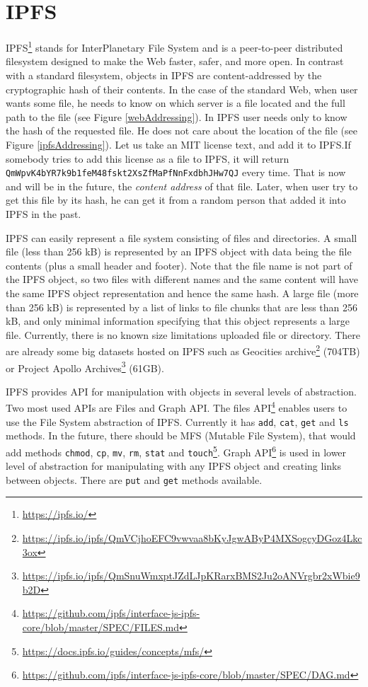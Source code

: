 \chapter{IPFS}
\label{ipfs}

IPFS\footnote{\url{https://ipfs.io/}} stands for InterPlanetary File System and is a peer-to-peer distributed filesystem designed to make the Web faster, safer, and more open. In contrast with a standard filesystem, objects in IPFS are content-addressed by the cryptographic hash of their contents. In the case of the standard Web, when user wants some file, he needs to know on which server is a file located and the full path to the file (see Figure \ref{webAddressing}). In IPFS user needs only to know the hash of the requested file. He does not care about the location of the file (see Figure \ref{ipfsAddressing}). Let us take an MIT license text, and add it to IPFS.If somebody tries to add this license as a file to IPFS, it will return \texttt{QmWpvK4bYR7k9b1feM48fsk\-t2XsZfMaPfNnFxdbhJHw7QJ} every time. That is now and will be in the future, the \textit{content address} of that file. Later, when user try to get this file by its hash, he can get it from a random person that added it into IPFS in the past.

IPFS can easily represent a file system consisting of files and directories. A small file (less than 256 kB) is represented by an IPFS object with data being the file contents (plus a small header and footer). Note that the file name is not part of the IPFS object, so two files with different names and the same content will have the same IPFS object representation and hence the same hash. A large file (more than 256 kB) is represented by a list of links to file chunks that are less than 256 kB, and only minimal information specifying that this object represents a large file. Currently, there is no known size limitations uploaded file or directory. There are already some big datasets hosted on IPFS such as Geocities archive\footnote{\url{https://ipfs.io/ipfs/QmVCjhoEFC9vwvaa8bKyJgwAByP4MXSogcyDGoz4Lkc3ox}} (704TB) or Project Apollo Archives\footnote{\url{https://ipfs.io/ipfs/QmSnuWmxptJZdLJpKRarxBMS2Ju2oANVrgbr2xWbie9b2D}} (61GB).

IPFS provides API for manipulation with objects in several levels of abstraction. Two most used APIs are Files and Graph API. 
The files API\footnote{\url{https://github.com/ipfs/interface-js-ipfs-core/blob/master/SPEC/FILES.md}} enables users to use the File System abstraction of IPFS. Currently it has \texttt{add},  \texttt{cat},  \texttt{get} and  \texttt{ls} methods. In the future, there should be MFS (Mutable File System), that would add methods \texttt{chmod}, \texttt{cp}, \texttt{mv}, \texttt{rm}, \texttt{stat} and \texttt{touch}\footnote{\url{https://docs.ipfs.io/guides/concepts/mfs/}}.
Graph API\footnote{\url{https://github.com/ipfs/interface-js-ipfs-core/blob/master/SPEC/DAG.md}} is used in lower level of abstraction for manipulating with any IPFS object and creating links between objects. There are \texttt{put} and \texttt{get} methods available. 

